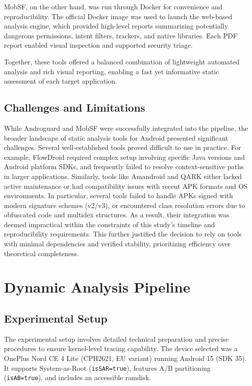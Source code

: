 \documentclass[a4paper,12pt]{report}
\begin{document}
MobSF, on the other hand, was run through Docker for convenience and reproducibility. The official Docker image was used to launch the web-based analysis engine, which provided high-level reports summarizing potentially dangerous permissions, intent filters, trackers, and native libraries. Each PDF report enabled visual inspection and supported security triage.

Together, these tools offered a balanced combination of lightweight automated analysis and rich visual reporting, enabling a fast yet informative static assessment of each target application.


\subsection{Challenges and Limitations}

While Androguard and MobSF were successfully integrated into the pipeline, the broader landscape of static analysis tools for Android presented significant challenges. Several well-established tools proved difficult to use in practice. For example, FlowDroid required complex setup involving specific Java versions and Android platform SDKs, and frequently failed to resolve context-sensitive paths in larger applications. Similarly, tools like Amandroid and QARK either lacked active maintenance or had compatibility issues with recent APK formats and OS environments. In particular, several tools failed to handle APKs signed with modern signature schemes (v2/v3), or encountered class resolution errors due to obfuscated code and multidex structures. As a result, their integration was deemed impractical within the constraints of this study’s timeline and reproducibility requirements. This further justified the decision to rely on tools with minimal dependencies and verified stability, prioritizing efficiency over theoretical completeness.




\section{Dynamic Analysis Pipeline}
\subsection{Experimental Setup}

The experimental setup involves detailed technical preparation and precise procedures to ensure kernel-level tracing capability. The device selected was a OnePlus Nord CE 4 Lite (CPH2621, EU variant) running Android 15 (SDK 35). It supports System-as-Root (\texttt{isSAR=true}), features A/B partitioning (\texttt{isAB=true}), and includes an accessible ramdisk.
\end{document}
